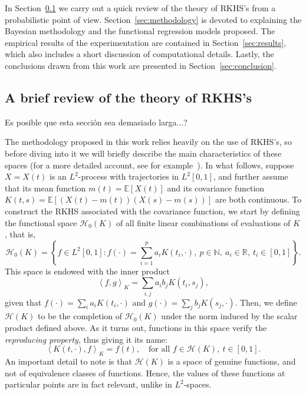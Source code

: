 \documentclass[ba]{imsart}
\numberwithin{equation}{section}
\theoremstyle{plain}
\newcommand{\N}{\mathbb{N}}
\newcommand{\R}{\mathbb{R}}
\newcommand\dotprod[2]{\left\langle #1, #2 \right\rangle}
\newenvironment{comment}
{
\noindent \em \color{red}
}
{
\color{black}
}
\begin{document}
In Section~\ref{sec:rkhs} we carry out a quick review of the theory of RKHS's from a probabilistic point of view. Section~\ref{sec:methodology} is devoted to explaining the Bayesian methodology and the functional regression models proposed. The empirical results of the experimentation are contained in Section~\ref{sec:results}, which also includes a short discussion of computational details. Lastly, the conclusions drawn from this work are presented in Section~\ref{sec:conclusion}.

\subsection{A brief review of the theory of RKHS's}\label{sec:rkhs}

\begin{comment}
  Es posible que esta sección sea demasiado larga...?
\end{comment}

The methodology proposed in this work relies heavily on the use of RKHS's, so before diving into it we will briefly describe the main characteristics of these spaces (for a more detailed account, see for example~\citet{berlinet2004reproducing}). In what follows, suppose \(X=X(t)\) is an \(L^2\)-process with trajectories in \(L^2[0,1]\), and further assume that its mean function \(m(t)=\mathbb E[X(t)]\) and its covariance function \(K(t, s)= \mathbb E[(X(t) - m(t))(X(s) - m(s))]\) are both continuous. To construct the RKHS associated with the covariance function, we start by defining the functional space \(\mathcal H_0(K)\) of all finite linear combinations of evaluations of \(K\), that is,
\[
\mathcal H_0(K) = \left\{ f \in L^2[0,1]: f(\cdot) = \sum_{i=1}^p a_i K(t_i, \cdot), \ p \in \N, \ a_i \in \R, \ t_i \in [0, 1] \right\}.
\]
This space is endowed with the inner product
\[
\dotprod{f}{g}_K = \sum_{i, j} a_i b_j K(t_i, s_j),
\]
given that \(f(\cdot)=\sum_i a_i K(t_i, \cdot) \) and \(g(\cdot)=\sum_j b_j K(s_j, \cdot)\). Then, we define \(\mathcal H(K)\) to be the completion of \(\mathcal H_0(K)\) under the norm induced by the scalar product defined above. As it turns out, functions in this space verify the \textit{reproducing property}, thus giving it its name:
\begin{equation}\label{eq:reproducing-property}
  \dotprod{K(t, \cdot)}{f}_K = f(t), \quad \text{for all } f \in \mathcal H(K), \ t \in [0, 1].
\end{equation}
An important detail to note is that \(\mathcal H(K)\) is a space of genuine functions, and not of equivalence classes of functions. Hence, the values of these functions at particular points are in fact relevant, unlike in \(L^2\)-spaces.
\end{document}
